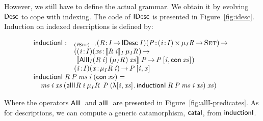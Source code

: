 However, we still have to define the actual grammar. We obtain it by
evolving $\Desc$ to cope with indexing.  The code of $\IDesc{\!}$ is presented in
Figure~\ref{fig:idesc}. Induction on indexed descriptions is defined
by:

\[\stk{
\begin{array}{@{}ll}
\F{inductionI} : & _{\PI{\V{I}}{\Set}}
                   \PITEL{\V{R}}{\V{I} \To \IDesc{\V{I}}}
                   \PI{\V{P}}{\SIGMA{\V{i}}{\V{I}} \IMu{\V{I}}{\V{R}}{\!} \To \Set} \\
                 & (      \PITEL{\V{i}}{\V{I}} 
                          \PI{\V{xs}}{\idescop{\V{R}\: \V{i}}{\V{I}}{\IMu{\V{I}}{\V{R}}{\!}}} \\
                 & \   \idescop{\AllI{\V{I}}
                                     {(\V{R}\: \V{i})}
                                     {(\IMu{\V{I}}{\V{R}}{\!})}
                                     {\V{xs}}}
                               {}
                               {\V{P}} \To
                       \V{P}\: \pair{\V{i}}{\Con{\V{xs}}}{}) \\
                 & \PITEL{\V{i}}{\V{I}}
                   \PI{\V{x}}{\IMu{\V{I}}{\V{R}}{\V{i}}}
                   \V{P}\: \pair{\V{i}}{\V{x}}{}
\end{array} \\
\F{inductionI}\: \V{R}\: \V{P}\: \V{ms}\: \V{i}\: (\Con{\V{xs}}) =  \\
\quad
    \V{ms}\: \V{i}\: \V{xs}\: (\allI{}
                                    {\V{R}\: \V{i}}
                                    {\IMu{\V{I}}{R}{}}
                                    {\V{P}}
                                    {(\LAM{\pair{\V{i}}{\V{xs}}{}} \F{inductionI}\: \V{R}\: \V{P}\: \V{ms}\: \V{i}\: \V{xs})}
                                    {\V{xs}})
}\]

Where the operators $\AllI{}{\!}{\!}{}$ and
$\allI{}{\!}{\!}{\!}{\!}{}$ are presented in
Figure~\ref{fig:allI-predicates}. As for descriptions, we can compute
a generic catamorphism, $\F{cataI}$, from $\F{inductionI}$.


